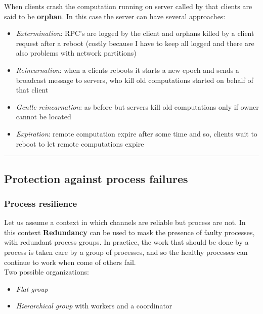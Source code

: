 When clients crash the computation running on server called by that
clients are said to be \textbf{orphan}. In this case the server can have
several approaches:

\begin{itemize}
\itemsep1pt\parskip0pt
\item
  \emph{Extermination}: RPC's are logged by the client and orphans
  killed by a client request after a reboot (costly because I have to
  keep all logged and there are also problems with network partitions)
\item
  \emph{Reincarnation}: when a clients reboots it starts a new epoch and
  sends a broadcast message to servers, who kill old computations
  started on behalf of that client
\item
  \emph{Gentle reincarnation}: as before but servers kill old
  computations only if owner cannot be located
\item
  \emph{Expiration}: remote computation expire after some time and so,
  clients wait to reboot to let remote computations expire
\end{itemize}

\begin{center}\rule{3in}{0.4pt}\end{center}

\subsection{Protection against process
failures}\label{protection-against-process-failures}

\subsubsection{Process resilience}\label{process-resilience}

Let us assume a context in which channels are reliable but process are not. In this context \textbf{Redundancy} can be used to mask the presence of faulty
processes, with redundant process groups. In practice, the work that
should be done by a process is taken care by a group of processes, and
so the healthy processes can continue to work when come of others fail.\\
Two possible organizations:

\begin{itemize}
\itemsep1pt\parskip0pt
\item
  \textit{Flat group}
\item
  \textit{Hierarchical group} with workers and a coordinator
\end{itemize}

